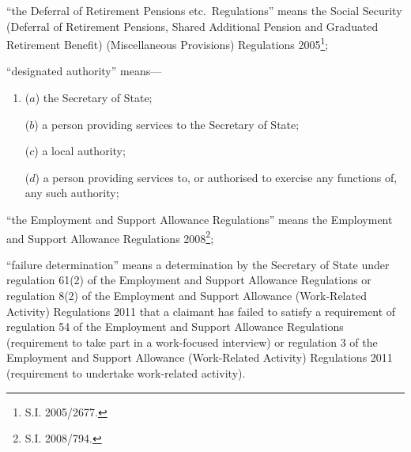 \documentclass[12pt,a4paper]{article}
\begin{document}
\begin{enumerate}
“the Deferral of Retirement Pensions etc.\ Regulations” means the Social Security (Deferral of Retirement Pensions, Shared Additional Pension and Graduated Retirement Benefit) (Miscellaneous Provisions) Regulations 2005\footnote{S.I. 2005/2677.};


“designated authority” means—
\begin{enumerate}\item[]
    ($a$)     the Secretary of State;

    ($b$) 
    a person providing services to the Secretary of State;

    ($c$) 
    a local authority;

    ($d$) 
    a person providing services to, or authorised to exercise any functions of, any such authority;
\end{enumerate}

“the Employment and Support Allowance Regulations” means the Employment and Support Allowance Regulations 2008\footnote{S.I. 2008/794.};


“failure determination” means a determination by the Secretary of State under regulation 61(2) of the Employment and Support Allowance Regulations or regulation 8(2) of the Employment and Support Allowance (Work-Related Activity) Regulations 2011 that a claimant has failed to satisfy a requirement of regulation 54 of the Employment and Support Allowance Regulations (requirement to take part in a work-focused interview) or regulation 3 of the Employment and Support Allowance (Work-Related Activity) Regulations 2011 (requirement to undertake work-related activity).


\end{enumerate}
\end{document}

